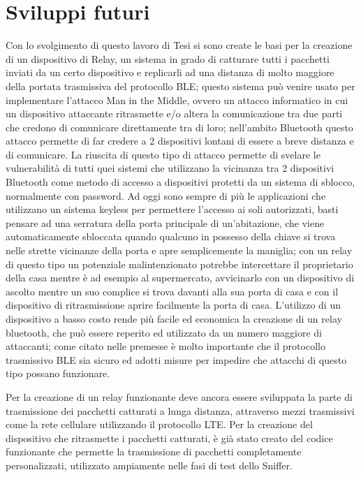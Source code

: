 \section{Sviluppi futuri}
Con lo svolgimento di questo lavoro di Tesi si sono create le basi per la creazione di un dispositivo di Relay, un sistema in grado di catturare tutti i pacchetti inviati da un certo dispositivo e replicarli ad una distanza di molto maggiore della portata trasmissiva del protocollo BLE; questo sistema può venire usato per implementare l'attacco Man in the Middle, ovvero un attacco informatico in cui un dispositivo attaccante ritrasmette e/o altera la comunicazione tra due parti che credono di comunicare direttamente tra di loro; nell'ambito Bluetooth questo attacco permette di far credere a 2 dispositivi lontani  di essere a breve distanza e di comunicare. 
La riuscita di questo tipo di attacco permette di svelare le vulnerabilità di tutti quei sistemi che utilizzano la vicinanza tra 2 dispositivi Bluetooth come metodo di accesso a dispositivi protetti da un sistema di sblocco, normalmente con password.
Ad oggi sono sempre di più le applicazioni che utilizzano un sistema keyless per permettere l'accesso ai soli autorizzati, basti pensare ad una serratura della porta principale di un'abitazione, che viene automaticamente sbloccata quando qualcuno in possesso della chiave si trova nelle strette vicinanze della porta e apre semplicemente la maniglia; con un relay di questo tipo un potenziale malintenzionato potrebbe intercettare il proprietario della casa mentre è ad esempio al supermercato, avvicinarlo con un dispositivo di ascolto mentre un suo complice si trova davanti alla sua porta di casa e con il dispositivo di ritrasmissione aprire facilmente la porta di casa.
L'utilizzo di un dispositivo a basso costo rende più facile ed economica la creazione di un relay bluetooth, che può essere reperito ed utilizzato da un numero maggiore di attaccanti; come citato nelle premesse è molto importante che il protocollo trasmissivo BLE sia sicuro ed adotti misure per impedire che attacchi di questo tipo possano funzionare.

Per la creazione di un relay funzionante deve ancora essere sviluppata la parte di trasmissione dei pacchetti catturati a lunga distanza, attraverso mezzi trasmissivi come la rete cellulare utilizzando il protocollo LTE. Per la creazione del dispositivo che ritrasmette i pacchetti catturati, è già stato creato del codice funzionante che permette la trasmissione di pacchetti completamente personalizzati, utilizzato ampiamente nelle fasi di test dello Sniffer.

